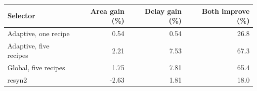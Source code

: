 \begin{tabular}{@{}lrrr@{}}
\toprule
\textbf{Selector} & \textbf{Area gain (\%)} & \textbf{Delay gain (\%)} & \textbf{Both improve (\%)} \\
\midrule
Adaptive, one recipe & 0.54 & 0.54 & 26.8 \\
Adaptive, five recipes & 2.21 & 7.53 & 67.3 \\
Global, five recipes & 1.75 & 7.81 & 65.4 \\
resyn2 & -2.63 & 1.81 & 18.0 \\
\bottomrule
\end{tabular}
